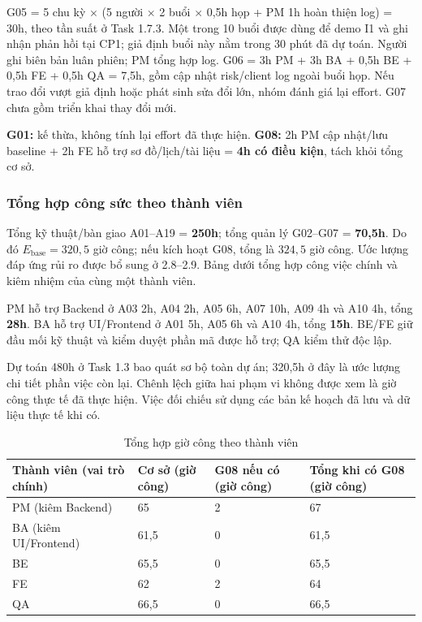 \documentclass{article}
\begin{document}
\begin{landscape}
\noindent G05 = 5 chu kỳ $\times$ (5 người $\times$ 2 buổi $\times$ 0,5h họp + PM 1h hoàn thiện log) = 30h, theo tần suất ở Task 1.7.3. Một trong 10 buổi được dùng để demo I1 và ghi nhận phản hồi tại CP1; giả định buổi này nằm trong 30 phút đã dự toán. Người ghi biên bản luân phiên; PM tổng hợp log. G06 = 3h PM + 3h BA + 0,5h BE + 0,5h FE + 0,5h QA = 7,5h, gồm cập nhật risk/client log ngoài buổi họp. Nếu trao đổi vượt giả định hoặc phát sinh sửa đổi lớn, nhóm đánh giá lại effort. G07 chưa gồm triển khai thay đổi mới.

\medskip
\noindent \textbf{G01:} kế thừa, không tính lại effort đã thực hiện. \textbf{G08:} 2h PM cập nhật/lưu baseline + 2h FE hỗ trợ sơ đồ/lịch/tài liệu = \textbf{4h có điều kiện}, tách khỏi tổng cơ sở.
\newpage
\subsubsection{Tổng hợp công sức theo thành viên}
Tổng kỹ thuật/bàn giao A01--A19 = \textbf{250h}; tổng quản lý G02--G07 = \textbf{70,5h}. Do đó $E_{\mathrm{base}}=320{,}5$ giờ công; nếu kích hoạt G08, tổng là $324{,}5$ giờ công. Ước lượng đáp ứng rủi ro được bổ sung ở 2.8--2.9. Bảng dưới tổng hợp công việc chính và kiêm nhiệm của cùng một thành viên.

PM hỗ trợ Backend ở A03 2h, A04 2h, A05 6h, A07 10h, A09 4h và A10 4h, tổng \textbf{28h}. BA hỗ trợ UI/Frontend ở A01 5h, A05 6h và A10 4h, tổng \textbf{15h}. BE/FE giữ đầu mối kỹ thuật và kiểm duyệt phần mã được hỗ trợ; QA kiểm thử độc lập.

Dự toán 480h ở Task 1.3 bao quát sơ bộ toàn dự án; 320,5h ở đây là ước lượng chi tiết phần việc còn lại. Chênh lệch giữa hai phạm vi không được xem là giờ công thực tế đã thực hiện. Việc đối chiếu sử dụng các bản kế hoạch đã lưu và dữ liệu thực tế khi có.

\begin{table}[H]
\centering
\caption{Tổng hợp giờ công theo thành viên}
\renewcommand{\arraystretch}{1.25}
\begin{tabularx}{\linewidth}{|p{3.8cm}|X|X|X|}
\hline
\textbf{Thành viên (vai trò chính)} & \textbf{Cơ sở (giờ công)} & \textbf{G08 nếu có (giờ công)} & \textbf{Tổng khi có G08 (giờ công)} \\ \hline
PM (kiêm Backend) & 65 & 2 & 67 \\ \hline
BA (kiêm UI/Frontend) & 61,5 & 0 & 61,5 \\ \hline
BE & 65,5 & 0 & 65,5 \\ \hline
FE & 62 & 2 & 64 \\ \hline
QA & 66,5 & 0 & 66,5 \\ \hline


\end{tabularx}
\end{table}
\end{landscape}
\end{document}
